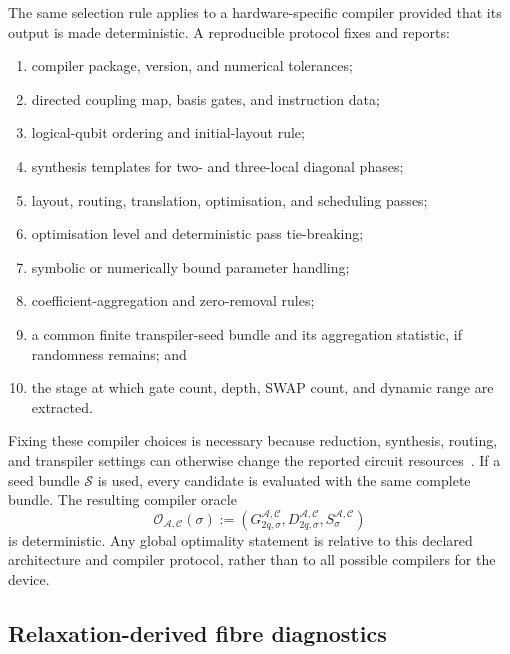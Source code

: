\documentclass[a4paper,onecolumn,11pt,unpublished]{quantumarticle}
\theoremstyle{remark}
\begin{document}
The same selection rule applies to a hardware-specific compiler provided
that its output is made deterministic.  A reproducible protocol fixes and
reports:
\begin{enumerate}
    \item compiler package, version, and numerical tolerances;
    \item directed coupling map, basis gates, and instruction data;
    \item logical-qubit ordering and initial-layout rule;
    \item synthesis templates for two- and three-local diagonal phases;
    \item layout, routing, translation, optimisation, and scheduling passes;
    \item optimisation level and deterministic pass tie-breaking;
    \item symbolic or numerically bound parameter handling;
    \item coefficient-aggregation and zero-removal rules;
    \item a common finite transpiler-seed bundle and its aggregation
    statistic, if randomness remains; and
    \item the stage at which gate count, depth, SWAP count, and dynamic
    range are extracted.
\end{enumerate}
Fixing these compiler choices is necessary because reduction, synthesis,
routing, and transpiler settings can otherwise change the reported circuit
resources~\cite{Schmidbauer2024,Weidenfeller2022,Rovara2026}.
If a seed bundle \(\mathcal S\) is used, every candidate is evaluated with
the same complete bundle.  The resulting compiler oracle
\begin{equation}
    \mathcal O_{\mathcal A,\mathcal C}(\sigma)
    :=
    \left(
        G_{2q,\sigma}^{\mathcal A,\mathcal C},
        D_{2q,\sigma}^{\mathcal A,\mathcal C},
        S_\sigma^{\mathcal A,\mathcal C}
    \right)
    \label{eq:deterministic-compiler-oracle}
\end{equation}
is deterministic.  Any global optimality statement is relative to this
declared architecture and compiler protocol, rather than to all possible
compilers for the device.


\subsection{Relaxation-derived fibre diagnostics}
\label{app:fibre-risk}
\end{document}
